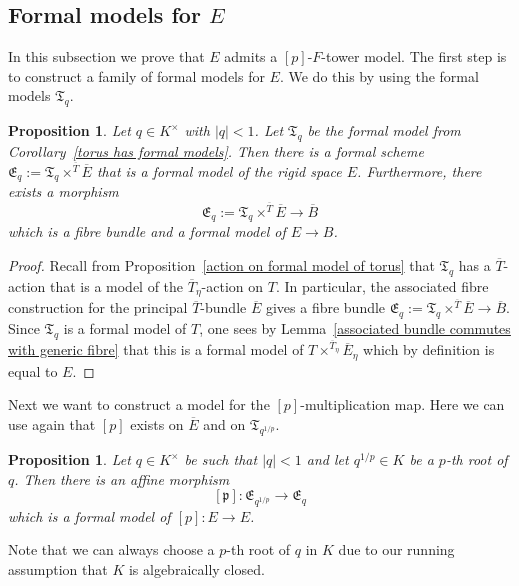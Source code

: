 \documentclass[10pt,oneside]{amsart}
\newtheorem{proposition}[theorem]{Proposition}
\theoremstyle{definition}
\begin{document}
	\subsection{Formal models for $E$}
	In this subsection we prove that $E$ admits a $[p]$-$F$-tower model. The first step is to construct a family of formal models for $E$. We do this by using the formal models $\mathfrak T_q$.
	\begin{proposition}
	Let $q\in K^\times$ with $|q|<1$. Let $\mathfrak T_q$ be the formal model from Corollary~\ref{torus has formal models}. Then there is a formal scheme $\mathfrak E_q :=\mathfrak T_q \times^{\overline{T}}\overline{E}$ that is a formal model of the rigid space $E$. Furthermore, there exists a morphism
	\[\mathfrak E_q :=\mathfrak T_q \times^{\overline{T}} \overline{E} \rightarrow \overline{B} \]
	which is a fibre bundle and a formal model of $E\rightarrow B$.
	\end{proposition}
	\begin{proof}
		Recall from Proposition~\ref{action on formal model of torus} that $\mathfrak T_q$ has a $\overline{T}$-action that is a model of the $\overline{T}_\eta$-action on $T$. In particular, the associated fibre construction for the principal $\overline{T}$-bundle $\overline{E}$ gives a fibre bundle $\mathfrak E_q :=\mathfrak T_q \times^{\overline{T}} \overline{E} \rightarrow \overline{B}$. Since $\mathfrak T_q$ is a formal model of $T$, one sees by Lemma~\ref{associated bundle commutes with generic fibre} that this is a formal model of $T\times^{\overline{T}_\eta}\overline{E}_\eta$ which by definition is equal to $E$.
	\end{proof}
	Next we want to construct a model for the $[p]$-multiplication map. Here we can use again that $[p]$ exists on $\overline{E}$ and on $\mathfrak T_{q^{1/p}}$.
	\begin{proposition}\label{formal model of p-multiplication on E}
		Let $q\in K^\times$ be such that $|q|<1$ and let $q^{1/p}\in K$ be a $p$-th root of $q$. Then there is an affine morphism
		\[[\mathfrak p]:\mathfrak E_{q^{1/p}} \rightarrow  \mathfrak E_{q}\]
		which is a formal model of $[p]:E\rightarrow E$.
	\end{proposition}
		Note that we can always choose a $p$-th root of $q$ in $K$ due to our running assumption that $K$ is algebraically closed.
\end{document}
